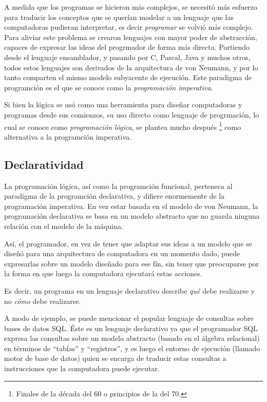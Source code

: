 \documentclass[12pt,titlepage]{article}
\begin{document}
A medida que los programas se hicieron más complejos, se necesitó más esfuerzo para traducir los conceptos que se querían modelar a un lenguaje que las computadoras pudieran interpretar, es decir \emph{programar} se volvió más complejo. Para aliviar este problema se crearon lenguajes con mayor poder de abstracción, capaces de expresar las ideas del progrmador de forma más directa. Partiendo desde el lenguaje ensamblador, y pasando por C, Pascal, Java y muchos otros, todos estos lenguajes son derivados de la arquitectura de von Neumann, y por lo tanto comparten el mismo modelo subyacente de ejecución. Este paradigma de programción es el que se conoce como la \emph{programación imperativa}.

Si bien la lógica se usó como una herramienta para diseñar computadoras y programas desde sus comienzos, su uso directo como lenguaje de progrmación, lo cual se conoce como \emph{programación lógica}, se plantea mucho después \footnote{Finales de la década del 60 o principios de la del 70.} como alternativa a la programción imperativa.

\subsection{Declaratividad}

La programación lógica, así como la programción funcional, perteneca al paradigma de la programción declarativa, y difiere enormemente de la programación imperativa. En vez estar basada en el modelo de von Neumann, la programación declarativa se basa en un modelo abstracto que no guarda ninguna relación con el modelo de la máquina. 

Así, el programador, en vez de tener que adaptar sus ideas a un modelo que se diseñó para una arquitectura de computadora en un momento dado, puede expresarlas sobre un modelo diseñado para ese fín, sin tener que preocuparse por la forma en que luego la computadora ejecutará estas acciones. 

Es decir, un programa en un lenguaje declarativo describe \emph{qué} debe realizarse y no \emph{cómo} debe realizarse.

A modo de ejemplo, se puede mencionar el popular lenguaje de consultas sobre bases de datos SQL. Éste es un lenguaje declarativo ya que el programador SQL expresa las consultas sobre un modelo abstracto (basado en el álgebra relacional) en términos de ``tablas'' y ``registros'', y es luego el entorno de ejecución (llamado motor de base de datos) quien se encarga de traducir estas consultas a instrucciones que la computadora puede ejecutar.
\end{document}

